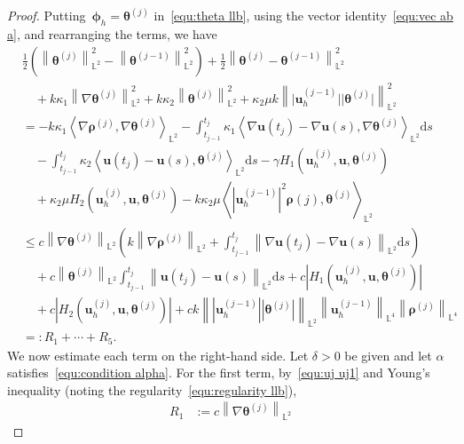 \documentclass[11pt,reqno]{amsart}
\theoremstyle{definition}
\numberwithin{equation}{section}
\newcommand{\bff}{\boldsymbol}
\newcommand{\bb}{\mathbb}
\newcommand{\ds}{\mathrm{d}s}
\newcommand{\nn}{\nonumber}
\newcommand{\norm}[2]{\left\|{#1}\right\|_{#2}}
\newcommand{\inpro}[2]{\left\langle#1,#2\right\rangle}
\newcommand{\abs}[1]{\left|{#1}\right|}
\begin{document}
\begin{proof}
    Putting~$\bff{\phi}_h=\bff{\theta}^{(j)}$ in~\eqref{equ:theta llb}, using the vector identity~\eqref{equ:vec ab a}, and rearranging the terms, we have
\begin{align}\label{equ:theta sum llb}
	&\frac{1}{2} \left(\norm{\bff{\theta}^{(j)}}{\bb{L}^2}^2 - \norm{\bff{\theta}^{(j-1)}}{\bb{L}^2}^2\right)
	+
	\frac{1}{2} \norm{\bff{\theta}^{(j)}- \bff{\theta}^{(j-1)}}{\bb{L}^2}^2
	\nn \\
	&\quad
	+
	k\kappa_1 \norm{\nabla \bff{\theta}^{(j)}}{\bb{L}^2}^2
	+
	k\kappa_2 \norm{\bff{\theta}^{(j)}}{\bb{L}^2}^2
	+
	\kappa_2 \mu k \norm{\big|\bff{u}_h^{(j-1)}\big| \big|\bff{\theta}^{(j)}\big|}{\bb{L}^2}^2
	\nn \\
	&=
	-
	k\kappa_1 \inpro{\nabla\bff{\rho}^{(j)}}{\nabla\bff{\theta}^{(j)}}_{\bb{L}^2}
	-
	\int_{t_{j-1}}^{t_j} \kappa_1 \inpro{\nabla\bff{u}(t_j)- \nabla \bff{u}(s)}{\nabla\bff{\theta}^{(j)}}_{\bb{L}^2} \ds
	\nn \\
	&\quad
	-
	\int_{t_{j-1}}^{t_j} \kappa_2 \inpro{\bff{u}(t_j)- \bff{u}(s)}{\bff{\theta}^{(j)}}_{\bb{L}^2} \ds
	-
	\gamma H_1(\bff{u}_h^{(j)},\bff{u},\bff{\theta}^{(j)}) 
	\nn \\
	&\quad
 	+ 
 	\kappa_2 \mu
	H_2(\bff{u}_h^{(j)},\bff{u},\bff{\theta}^{(j)}) 
 	-
 	k \kappa_2 \mu
 	\inpro{|\bff{u}_h^{(j-1)}|^2 \bff{\rho}{(j)}}{\bff{\theta}^{(j)}}_{\bb{L}^2}
	\nn \\
	&\le
	c\norm{\nabla\bff{\theta}^{(j)}}{\bb{L}^2} 
	\left(
		 k \norm{\nabla\bff{\rho}^{(j)}}{\bb{L}^2} 
		+
		 \int_{t_{j-1}}^{t_j}
		\norm{\nabla\bff{u}(t_j)-\nabla\bff{u}(s)}{\bb{L}^2} \ds
	\right)
	\nn \\
	&\quad
	+
	c\norm{\bff{\theta}^{(j)}}{\bb{L}^2} 
	\int_{t_{j-1}}^{t_j} 
	\norm{\bff{u}(t_j)-\bff{u}(s)}{\bb{L}^2} \ds
	+
	c
	\abs{H_1(\bff{u}_h^{(j)},\bff{u},\bff{\theta}^{(j)})}
	\nn \\
	&\quad
 	+ 
	c
	\abs{ H_2(\bff{u}_h^{(j)},\bff{u},\bff{\theta}^{(j)})}
	+
	ck
	\norm{|\bff{u}_h^{(j-1)}||\bff{\theta}^{(j)}|}{\bb{L}^2}
	\norm{\bff{u}_h^{(j-1)}}{\bb{L}^4}
	\norm{\bff{\rho}^{(j)}}{\bb{L}^4}
	\nn\\
	&=:
	R_1 + \cdots + R_5.
\end{align}
We now estimate each term on the right-hand side. Let $\delta>0$ be given and let $\alpha$ satisfies~\eqref{equ:condition alpha}. For
the first term, by~\eqref{equ:uj uj1} and Young's inequality (noting the regularity~\eqref{equ:regularity llb}),
\begin{align}\label{equ:llb R1}
	R_1
	&:=
	c \norm{\nabla\bff{\theta}^{(j)}}{\bb{L}^2} 

\end{align}
\end{proof}
\end{document}
